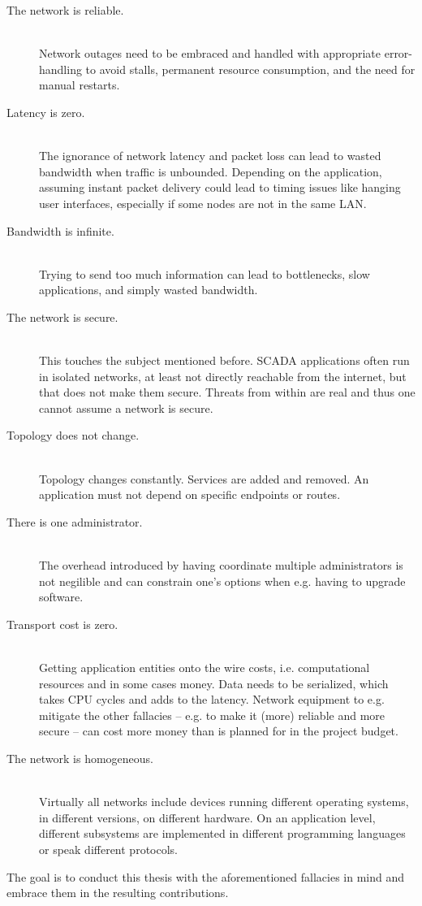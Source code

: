 \begin{description}
	\item [The network is reliable.] \hfill\\
		Network outages need to be embraced and handled with
		appropriate error-handling to avoid stalls, permanent
		resource consumption, and the need for manual restarts.

	\item [Latency is zero.] \hfill\\
		The ignorance of network latency and packet loss can lead to
		wasted bandwidth when traffic is unbounded. Depending on the
		application, assuming instant packet delivery could lead to
		timing issues like hanging user interfaces, especially if some
		nodes are not in the same LAN.

	\item [Bandwidth is infinite.] \hfill\\
		Trying to send too much information can lead to bottlenecks,
		slow applications, and simply wasted bandwidth.

	\item [The network is secure.] \hfill\\
		This touches the subject mentioned before. SCADA applications
		often run in isolated networks, at least not directly reachable
		from the internet, but that does not make them secure. Threats
		from within are real and thus one cannot assume a network is
		secure.

	\item [Topology does not change.] \hfill\\
		Topology changes constantly. Services are added and removed. An
		application must not depend on specific endpoints or routes.

	\item [There is one administrator.] \hfill\\
		The overhead introduced by having coordinate multiple
		administrators is not negilible and can constrain one's options
		when e.g. having to upgrade software.

	\item [Transport cost is zero.] \hfill\\
		Getting application entities onto the wire costs, i.e.
		computational resources and in some cases money. Data needs to
		be serialized, which takes CPU cycles and adds to the latency.
		Network equipment to e.g. mitigate the other fallacies -- e.g.
		to make it (more) reliable and more secure -- can cost more
		money than is planned for in the project budget.

	\item [The network is homogeneous.] \hfill\\
		Virtually all networks include devices running different
		operating systems, in different versions, on different
		hardware. On an application level, different subsystems are
		implemented in different programming languages or speak
		different protocols.

\end{description}

The goal is to conduct this thesis with the aforementioned fallacies in mind and embrace
them in the resulting contributions.
